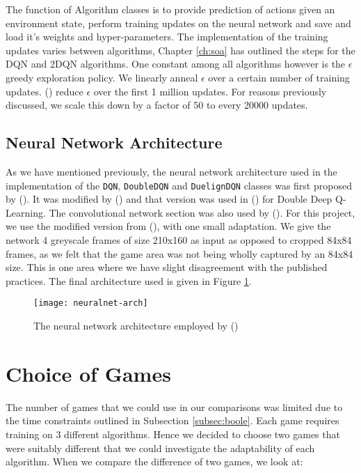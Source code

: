 The function of Algorithm classes is to provide prediction of actions given an environment state, perform training updates on the neural network and save and load it's weights and hyper-parameters. The implementation of the training updates varies between algorithms, Chapter \ref{ch:soa} has outlined the steps for the DQN and 2DQN algorithms. One constant among all algorithms however is the $\epsilon$ greedy exploration policy. We linearly anneal $\epsilon$ over a certain number of training updates. (\citet{deepmind1,doubleq,dueling}) reduce $\epsilon$ over the first 1 million updates. For reasons previously discussed, we scale this down by a factor of 50 to every 20000 updates.

\subsection{Neural Network Architecture}
As we have mentioned previously, the neural network architecture used in the implementation of the \texttt{DQN}, \texttt{DoubleDQN} and \texttt{DuelignDQN} classes was first proposed by (\citet{deepmind1}). It was modified by (\citet{human}) and that version was used in (\citet{doubleq}) for Double Deep Q-Learning. The convolutional network section was also used by (\citet{dueling}). For this project, we use the modified version from (\citet{human}), with one small adaptation. We give the network 4 greyscale frames of size 210x160 as input as opposed to cropped 84x84 frames, as we felt that the game area was not being wholly captured by an 84x84 size. This is one area where we have slight disagreement with the published practices. The final architecture used is given in Figure \ref{fig:nnarch}.

\begin{figure}[h]
	\centering
	\texttt{[image: neuralnet-arch]}
	\caption{The neural network architecture employed by (\citet{human})}
	\label{fig:nnarch}
\end{figure}

\section{Choice of Games} \label{sec:games}
The number of games that we could use in our comparisons was limited due to the time constraints outlined in Subsection \ref{subsec:boole}. Each game requires training on 3 different algorithms. Hence we decided to choose two games that were suitably different that we could investigate the adaptability of each algorithm. When we compare the difference of two games, we look at:

